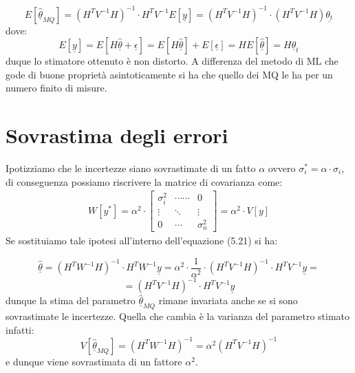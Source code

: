 \documentclass[11pt,a4paper]{book}
\begin{document}
\begin{equation*}
	E[\hat{\underline{\theta}}_{MQ}] = (H^TV^{-1}H)^{-1}\cdot H^TV^{-1}E[\underline{y}] = (H^TV^{-1}H)^{-1}\cdot (H^TV^{-1}H) \underline{\theta_t}
\end{equation*}
dove:
\begin{equation*}
	E[\underline{y}] = E[H \hat{\underline{\theta}} + \underline{\epsilon}] = E[H \hat{\underline{\theta}}] + E[\underline{\epsilon}] = H E[\hat{\underline{\theta}}] = H\underline{\theta}_t
\end{equation*}
duque lo stimatore ottenuto \`{e} non distorto.
\newline
A differenza del metodo di ML che gode di buone propriet\`{a} asintoticamente si ha che quello dei MQ le ha per un numero finito di misure.

\section{Sovrastima degli errori}

Ipotizziamo che le incertezze siano sovrastimate di un fatto $\alpha$ ovvero $\sigma_i^* = \alpha \cdot \sigma_i$, di conseguenza possiamo riscrivere la matrice di covarianza come:
\begin{align*}
W[y^*] = \alpha^2 \cdot  
\begin{bmatrix}
	\sigma_i^2 & \cdots\cdots & 0 \\
	\vdots & \ddots & \vdots \\
	0 & \cdots & \sigma_n^2
	\end{bmatrix}
	=\alpha^2 \cdot V[y]
\end{align*}
Se sostituiamo tale ipotesi all'interno dell'equazione (5.21) si ha:

\begin{equation}
	\underline{\hat{\theta }} = (H^TW^{-1}H)^{-1}\cdot H^TW^{-1}\underline{y} = \alpha^2 \cdot \dfrac{1}{\alpha^2} \cdot (H^TV^{-1}H)^{-1}\cdot H^TV^{-1}\underline{y} =  
\end{equation}
\begin{equation*}
	=(H^TV^{-1}H)^{-1}\cdot H^TV^{-1}\underline{y}
\end{equation*}
dunque la stima del parametro $\hat{\underline{\theta}}_{MQ}$ rimane invariata anche se si sono sovrastimate le incertezze. Quella che cambia \`{e} la varianza del parametro stimato infatti:
\begin{equation}
	V[\hat{\underline{\theta}}_{MQ}] = (H^{T}W^{-1}H)^{-1} = \alpha^2(H^{T}V^{-1}H)^{-1}
\end{equation}
e dunque viene sovrastimata di un fattore $\alpha^2$.
\end{document}
